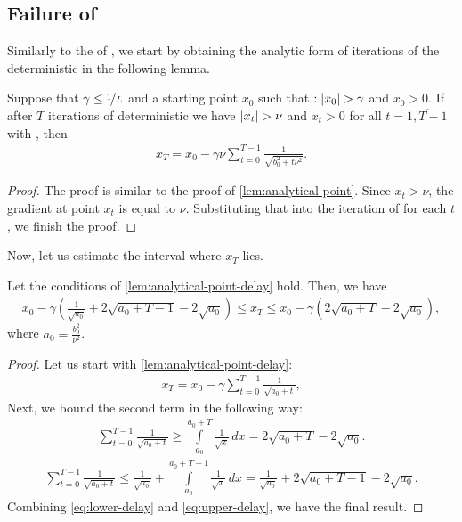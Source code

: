 \documentclass{article}
\begin{document}
\subsection{Failure of }
Similarly to the  of , we start by obtaining the analytic form of iterations of the deterministic  in the following lemma.
\begin{lemma}
\label{lem:analytical-point-delay}
    Suppose that $\gamma \leq \nicefrac{1}{L}$ and a starting point $x_0$ such that $: \left\lvert x_0\right\rvert > \gamma$ and $x_0 > 0$. If after $T$ iterations of deterministic  we have $\left\lvert x_t\right\rvert > \nu$ and $x_t > 0$ for all $t=\overline{1, T-1}$ with , then
    \begin{align*}
        x_T = x_0 - \gamma\nu\sum\limits_{t = 0}^{T-1}\frac{1}{\sqrt{b_0^2 + t\nu^2}}.
    \end{align*}
\end{lemma}
\begin{proof}
    The proof is similar to the proof of \cref{lem:analytical-point}. Since $x_t > \nu$, the gradient at point $x_t$ is equal to $\nu$. Substituting that into the iteration of  for each $t$, we finish the proof. 
\end{proof}
Now, let us estimate the interval where $x_T$ lies.
\begin{lemma}
    \label{lem:iter-bounds-huber-delay}
    Let the conditions of \cref{lem:analytical-point-delay} hold. Then, we have
    \begin{align*}
        x_0 - \gamma \left(\frac{1}{\sqrt{a_0}} + 2\sqrt{a_0 + T - 1} - 2\sqrt{a_0}\right) \leq x_T \leq x_0 - \gamma \left(2\sqrt{a_0 + T} - 2\sqrt{a_0}\right),
    \end{align*}
    where $a_0 = \frac{b_0^2}{\nu^2}$.
\end{lemma}
\begin{proof}
    Let us start with \cref{lem:analytical-point-delay}:
    \begin{align*}
        x_T = x_0 - \gamma\sum\limits_{t = 0}^{T-1}\frac{1}{\sqrt{a_0 + t}},
    \end{align*}
     Next, we bound the second term in the following way:
    \begin{align}
    \label{eq:lower-delay}
        \sum\limits_{t = 0}^{T-1}\frac{1}{\sqrt{a_0 + t}} \geq \int\limits_{a_0}^{a_0 + T}\frac{1}{\sqrt{x}}\,dx = 2\sqrt{a_0 + T} - 2\sqrt{a_0}. 
    \end{align}
    \begin{align}
    \label{eq:upper-delay}
        \sum\limits_{t = 0}^{T-1}\frac{1}{\sqrt{a_0 + t}} \leq \frac{1}{\sqrt{a_0}} + \int\limits_{a_0}^{a_0 + T - 1}\frac{1}{\sqrt{x}}\,dx = \frac{1}{\sqrt{a_0}} + 2\sqrt{a_0 + T - 1} - 2\sqrt{a_0}.
    \end{align}
    Combining \eqref{eq:lower-delay} and \eqref{eq:upper-delay}, we have the final result.
\end{proof}
\end{document}
